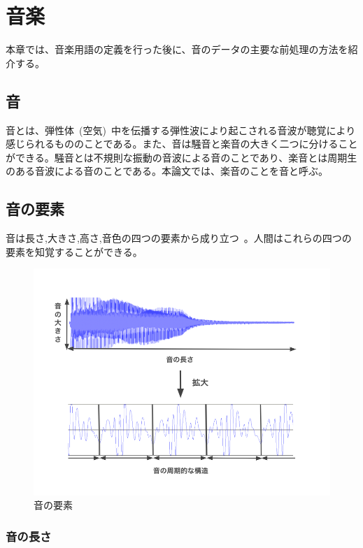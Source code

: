 \chapter{音楽}

本章では、音楽用語の定義を行った後に、音のデータの主要な前処理の方法を紹介する。

\section{音}

音とは、弾性体~(空気)~中を伝播する弾性波により起こされる音波が聴覚により感じられるもののことである。また、音は騒音と楽音の大きく二つに分けることができる。騒音とは不規則な振動の音波による音のことであり、楽音とは周期生のある音波による音のことである。本論文では、楽音のことを音と呼ぶ。

\section{音の要素}

音は長さ,大きさ,高さ,音色の四つの要素から成り立つ~\cite{音楽の基礎}。人間はこれらの四つの要素を知覚することができる。

\begin{figure}[t]
\begin{center}
\includegraphics[width=\hsize]{figure/gakuon.png}
\caption{音の要素}
\label{fig:gakuon}
\end{center}
\end{figure}

\subsection{音の長さ}

